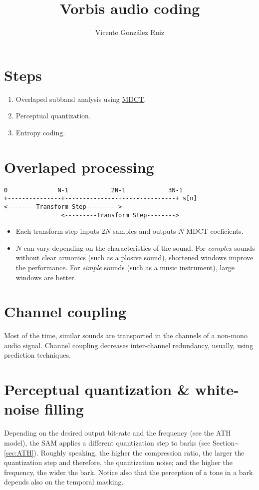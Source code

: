 \title{Vorbis audio coding}
\author{Vicente González Ruiz}
\maketitle
\tableofcontents

\section{Steps}
\begin{enumerate}
\def\labelenumi{\arabic{enumi}.}
\tightlist
\item
  Overlaped subband analysis using
  \href{http://en.wikipedia.org/wiki/Modified_discrete_cosine_transform}{MDCT}.
\item
  Perceptual quantization.
\item
  Entropy coding.
\end{enumerate}

\section{Overlaped processing}
\begin{verbatim}
0              N-1            2N-1            3N-1
+---------------+---------------+---------------+ s[n]
<--------Transform Step--------->
                <---------Transform Step-------->
\end{verbatim}

\begin{itemize}
\item
  Each transform step inputs \(2N\) samples and outputs \(N\) MDCT
  coeficients.
\item
  \(N\) can vary depending on the characteristics of the sound. For
  \emph{complex} sounds without clear armonics (such as a plosive
  sound), shortened windows improve the performance. For \emph{simple}
  sounds (such as a music instrument), large windows are better.
\end{itemize}

\section{Channel coupling}
Most of the time, similar sounds are transported in the channels of a
non-mono audio signal. Channel coupling decreases inter-channel
redundancy, usually, using prediction techniques.

\section{Perceptual quantization \& white-noise filling}
Depending on the desired output bit-rate and the frequency (see the ATH
model), the SAM applies a different quantization step to barks (see
Section\textasciitilde{}\ref{sec:ATH}). Roughly speaking, the higher the
compression ratio, the larger the quantization step and therefore, the
quantization noise; and the higher the frequency, the wider the bark.
Notice also that the perception of a tone in a bark depends also on the
temporal masking.

